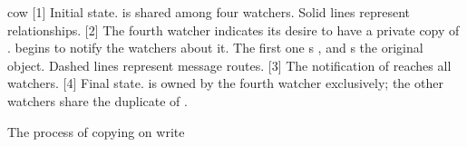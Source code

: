%
%

\begin{NewFig}[1.0cm]{cow}
%
[1]	{Initial state.  is shared among four watchers.
	Solid lines represent  relationships.}
[2]	{The fourth watcher indicates its desire to have a private copy
	of .   begins to notify the watchers about it.
	The first one s , and s the
	original object.  Dashed lines represent message routes.}
%
[3]	{The notification of  reaches all watchers.}
[4]	{Final state.   is owned by the fourth watcher
	exclusively; the other watchers share the duplicate of
	.}
\caption{The process of copying on write}
\end{NewFig}

